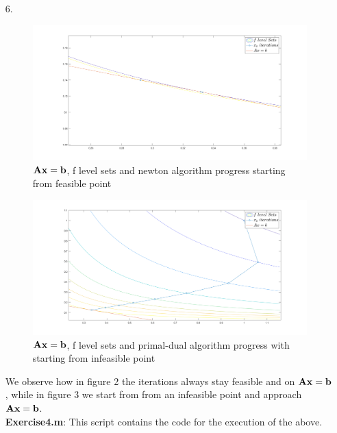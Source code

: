 \documentclass[12pt]{article}
\begin{document}
\begin{enumerate}
		\item[6.]
		\begin{figure}[h!]
			\begin{center}
				\includegraphics[width=\linewidth]{1}
			\end{center}
			\caption{${\bf A}{\bf x}={\bf b}$, f level sets and newton algorithm progress starting from feasible point}
		\end{figure}
		\begin{figure}[h!]
			\begin{center}
				\includegraphics[width=\linewidth]{3}
			\end{center}
			\caption{${\bf A}{\bf x}={\bf b}$, f level sets and primal-dual algorithm progress with starting from infeasible point}
		\end{figure}
		We observe how in figure 2 the iterations always stay feasible and on ${\bf A}{\bf x}={\bf b}$, while in figure 3 we start from from an infeasible point and approach ${\bf A}{\bf x}={\bf b}$.\\
		\newpage
		{\bf Exercise4.m}: This script contains the code for the execution of the above.
		
	\end{enumerate}
\end{document}
